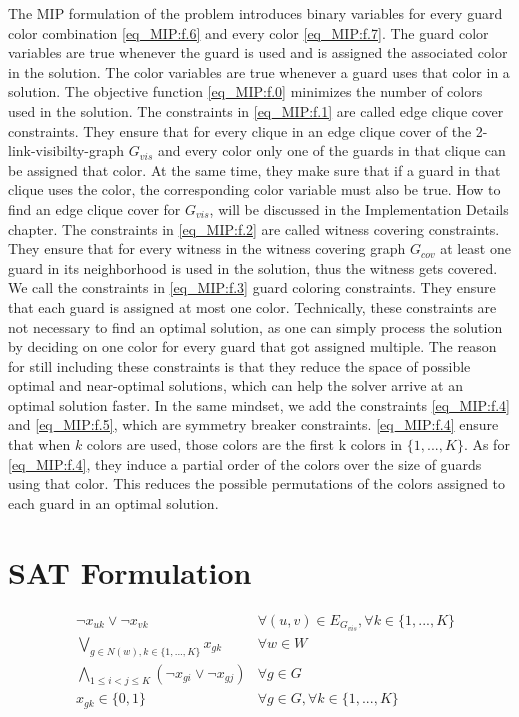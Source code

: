 The MIP formulation of the problem introduces binary variables for every guard color combination \cref{eq_MIP:f.6} and every color \cref{eq_MIP:f.7}. The guard color variables are true whenever the guard is used and is assigned the associated color in the solution. The color variables are true whenever a guard uses that color in a solution. The objective function \cref{eq_MIP:f.0} minimizes the number of colors used in the solution. The constraints in \cref{eq_MIP:f.1} are called edge clique cover constraints. They ensure that for every clique in an edge clique cover of the 2-link-visibilty-graph $G_{vis}$ and every color only one of the guards in that clique can be assigned that color. At the same time, they make sure that if a guard in that clique uses the color, the corresponding color variable must also be true. How to find an edge clique cover for $G_{vis}$, will be discussed in the Implementation Details chapter. The constraints in \cref{eq_MIP:f.2} are called witness covering constraints. They ensure that for every witness in the witness covering graph $G_{cov}$ at least one guard in its neighborhood is used in the solution, thus the witness gets covered. We call the constraints in \cref{eq_MIP:f.3} guard coloring constraints. They ensure that each guard is assigned at most one color. Technically, these constraints are not necessary to find an optimal solution, as one can simply process the solution by deciding on one color for every guard that got assigned multiple. The reason for still including these constraints is that they reduce the space of possible optimal and near-optimal solutions, which can help the solver arrive at an optimal solution faster. In the same mindset, we add the constraints \cref{eq_MIP:f.4} and \cref{eq_MIP:f.5}, which are symmetry breaker constraints. \cref{eq_MIP:f.4} ensure that when $k$ colors are used, those colors are the first k colors in $\{1,...,K\}$. As for \cref{eq_MIP:f.4}, they induce a partial order of the colors over the size of guards using that color. This reduces the possible permutations of the colors assigned to each guard in an optimal solution.

\section{SAT Formulation}

\begin{align}
\label{eq_SAT:f.0}&\lnot x_{uk} \lor \lnot x_{vk} & \forall (u,v)\in E_{G_{vis}}, \forall k\in \{1,...,K\}\\
\label{eq_SAT:f.1}&\bigvee_{g\in N(w), k\in \{1,...,K\}}x_{gk} & \forall w\in W\\
\label{eq_SAT:f.2}&\bigwedge_{1 \leq i < j \leq K} (\lnot x_{gi} \lor \lnot x_{gj}) & \forall g\in G\\
\label{eq:_SATf.3}& x_{gk} \in \{0,1\} & \forall g\in G, \forall k\in \{1,...,K\}
\end{align}

